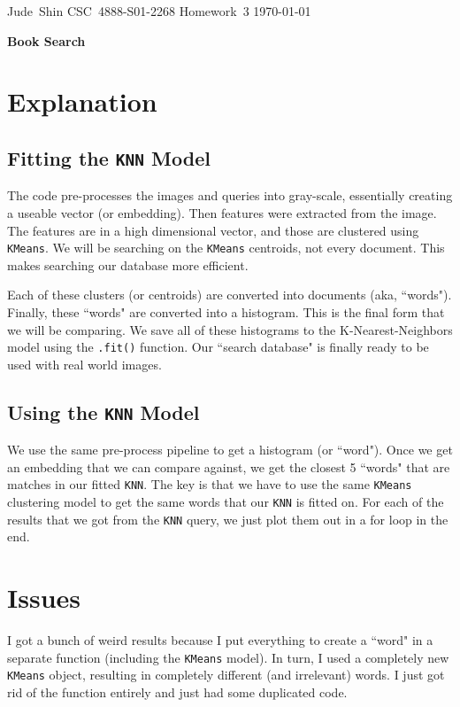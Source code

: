 \documentclass[11pt]{article}
\begin{document}
\hfill\vbox{\hbox{Jude Shin}
		\hbox{CSC 4888-S01-2268}	
		\hbox{Homework 3}	
		\hbox{\today}}\par

\bigskip
\centerline{\Large\bf Book Search}\par
\bigskip

\section{Explanation}

\subsection{Fitting the \lstinline{KNN} Model}

The code pre-processes the images and queries into gray-scale, essentially creating a useable vector (or embedding).
Then features were extracted from the image.
The features are in a high dimensional vector, and those are clustered using \lstinline{KMeans}.
We will be searching on the \lstinline{KMeans} centroids, not every document.
This makes searching our database more efficient.

Each of these clusters (or centroids) are converted into documents (aka, ``words").
Finally, these ``words" are converted into a histogram.
This is the final form that we will be comparing.
We save all of these histograms to the K-Nearest-Neighbors model using the \lstinline{.fit()} function.
Our ``search database" is finally ready to be used with real world images.

\subsection{Using the \lstinline{KNN} Model}

We use the same pre-process pipeline to get a histogram (or ``word").
Once we get an embedding that we can compare against, we get the closest 5 ``words" that are matches in our fitted \lstinline{KNN}.
The key is that we have to use the same \lstinline{KMeans} clustering model to get the same words that our \lstinline{KNN} is fitted on.
For each of the results that we got from the \lstinline{KNN} query, we just plot them out in a for loop in the end.

\section{Issues}

I got a bunch of weird results because I put everything to create a ``word" in a separate function (including the \lstinline{KMeans} model).
In turn, I used a completely new \lstinline{KMeans} object, resulting in completely different (and irrelevant) words.
I just got rid of the function entirely and just had some duplicated code.
\end{document}
